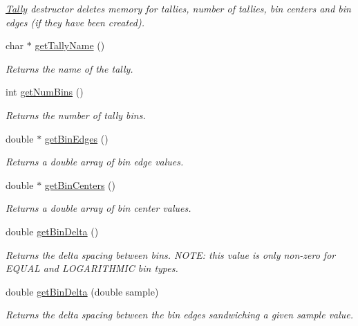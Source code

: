 \begin{DoxyCompactItemize}
\begin{DoxyCompactList}\small\item\em \hyperlink{classTally}{Tally} destructor deletes memory for tallies, number of tallies, bin centers and bin edges (if they have been created). \end{DoxyCompactList}\item 
char $\ast$ \hyperlink{classTally_a2f3a42563be7e98933c78c19e52e7c5c}{get\-Tally\-Name} ()
\begin{DoxyCompactList}\small\item\em Returns the name of the tally. \end{DoxyCompactList}\item 
int \hyperlink{classTally_ae518c682a3716d0b3321ae747ef92704}{get\-Num\-Bins} ()
\begin{DoxyCompactList}\small\item\em Returns the number of tally bins. \end{DoxyCompactList}\item 
double $\ast$ \hyperlink{classTally_afb306972b484690ea8898ce314d67d46}{get\-Bin\-Edges} ()
\begin{DoxyCompactList}\small\item\em Returns a double array of bin edge values. \end{DoxyCompactList}\item 
double $\ast$ \hyperlink{classTally_a3a878332f66dc19864b3d5b59ae04f2d}{get\-Bin\-Centers} ()
\begin{DoxyCompactList}\small\item\em Returns a double array of bin center values. \end{DoxyCompactList}\item 
double \hyperlink{classTally_a86b16eda439737ae86631a0b1f803289}{get\-Bin\-Delta} ()
\begin{DoxyCompactList}\small\item\em Returns the delta spacing between bins. N\-O\-T\-E\-: this value is only non-\/zero for E\-Q\-U\-A\-L and L\-O\-G\-A\-R\-I\-T\-H\-M\-I\-C bin types. \end{DoxyCompactList}\item 
double \hyperlink{classTally_a0d1dac1ef54d60773ea11fdc7f1d3307}{get\-Bin\-Delta} (double sample)
\begin{DoxyCompactList}\small\item\em Returns the delta spacing between the bin edges sandwiching a given sample value. \end{DoxyCompactList}\item 

\end{DoxyCompactItemize}
